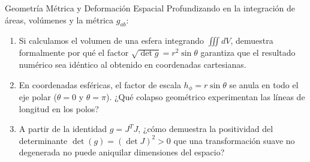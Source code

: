 \documentclass[10pt,aspectratio=169]{beamer}
\begin{document}
\begin{frame}{Geometría Métrica y Deformación Espacial}
  \vspace{0.2cm}
  Profundizando en la integración de áreas, volúmenes y la métrica $g_{ab}$:
  \vspace{0.3cm}
  \begin{enumerate}\itemsep14pt
    \item Si calculamos el volumen de una esfera integrando $\iiint dV$, demuestra formalmente por qué el factor $\sqrt{\det g} = r^2\sin\theta$ garantiza que el resultado numérico sea idéntico al obtenido en coordenadas cartesianas.
    \item En coordenadas esféricas, el factor de escala $h_\phi = r\sin\theta$ se anula en todo el eje polar ($\theta = 0$ y $\theta = \pi$). ¿Qué colapso geométrico experimentan las líneas de longitud en los polos?
    \item A partir de la identidad $g = J^T J$, ¿cómo demuestra la positividad del determinante $\det(g) = (\det J)^2 > 0$ que una transformación suave no degenerada no puede aniquilar dimensiones del espacio?
  \end{enumerate}
\end{frame}
\end{document}
